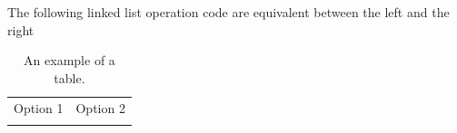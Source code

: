 The following linked list operation code are equivalent between the left and the right
\begin{table}[b]
    \begin{center}
        \caption{An example of a table.}
        \begin{tabular}{p{7cm}|p{7cm}}
            Option 1 & Option 2  \\
            
            &
             \\
        \end{tabular}
    \end{center}
\end{table}
